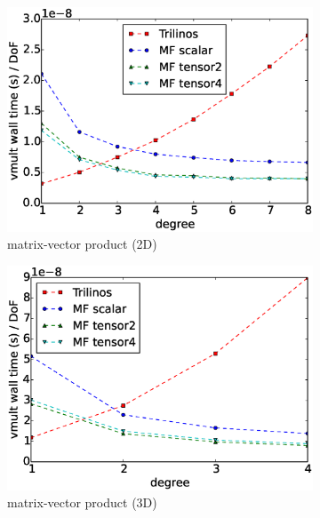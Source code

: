 \documentclass[preprint,12pt,times]{elsarticle}
\begin{document}
\begin{figure}[!ht]
  \centering
  \begin{subfigure}[b]{0.49\textwidth}
      \centering
      \includegraphics[width=\textwidth]{Emmy_RRZE_timing2d.eps}
      \caption{matrix-vector product (2D)}
      \label{fig:benchmark_miehe_Emmy_vmult2}
  \end{subfigure}
  \begin{subfigure}[b]{0.49\textwidth}
    \centering
    \includegraphics[width=\textwidth]{Emmy_RRZE_timing3d.eps}
    \caption{matrix-vector product (3D)}
    \label{fig:benchmark_miehe_Emmy_vmult3}
  \end{subfigure}
  ~
  \begin{subfigure}[b]{0.49\textwidth}
      \centering

\end{subfigure}
\end{figure}
\end{document}
